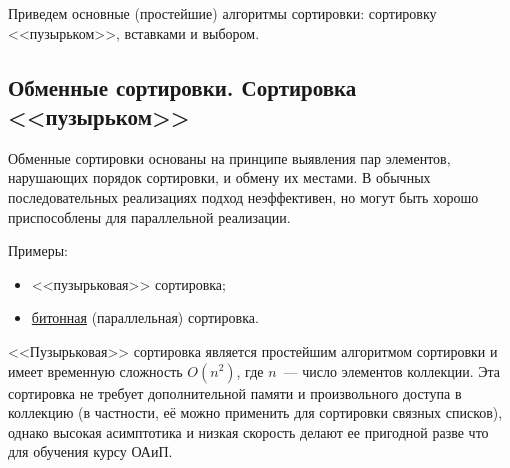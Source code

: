 
Приведем основные (простейшие) алгоритмы сортировки: сортировку <<пузырьком>>, вставками и выбором.

\subsection{Обменные сортировки. Сортировка <<пузырьком>>}
Обменные сортировки основаны на принципе выявления пар элементов, нарушающих порядок сортировки, и обмену их местами.
В обычных последовательных реализациях подход неэффективен, но могут быть хорошо приспособлены для параллельной реализации.

Примеры:
\begin{itemize}
  \item <<пузырьковая>> сортировка;
  \item \href{https://en.wikipedia.org/wiki/Bitonic_sorter}{битонная} (параллельная) сортировка.
\end{itemize}

<<Пузырьковая>> сортировка является простейшим алгоритмом сортировки и имеет временную сложность \(O(n^2)\), где \(n\)~--- число элементов коллекции.
Эта сортировка не требует дополнительной памяти и произвольного доступа в коллекцию (в частности, её можно применить для сортировки связных
списков), однако высокая асимптотика и низкая скорость делают ее пригодной разве что для обучения курсу ОАиП.

